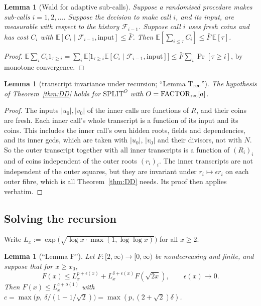 \documentclass[11pt]{amsart}
\newtheorem{lemma}[theorem]{Lemma}
\theoremstyle{definition}
\newcommand{\cF}{\mathcal{F}}
\newcommand{\Ex}{\mathbb{E}}
\newcommand{\Prob}{\Pr}
\begin{document}
\begin{lemma}[Wald for adaptive sub-calls]\label{lem:waldrec}
Suppose a randomised procedure makes sub-calls $i=1,2,\dots$. Suppose the decision to make call $i$, and its input, are measurable with
respect to the history $\cF_{i-1}$. Suppose call $i$ uses fresh coins and has cost $C_i$ with $\Ex[C_i\mid\cF_{i-1},\text{input}]\le\bar F$. Then
$\Ex[\sum_{i\le\tau}C_i]\le\bar F\,\Ex[\tau]$.
\end{lemma}

\begin{proof}
$\Ex\sum_iC_i1_{\tau\ge i}=\sum_i\Ex\bigl[1_{\tau\ge i}\Ex[C_i\mid\cF_{i-1},\text{input}]\bigr]\le\bar F\sum_i\Prob[\tau\ge i]$, by monotone
convergence.
\end{proof}

\begin{lemma}[transcript invariance under recursion; ``Lemma T$_{\rm rec}$'']\label{lem:Trec}
The hypothesis of Theorem~\ref{thm:DD} holds for $\mathrm{SPLIT}^O$ with $O=\mathrm{FACTOR}_{\rm rec}[a]$.
\end{lemma}

\begin{proof}
The inputs $|u_0|,|v_0|$ of the inner calls are functions of $R$, and their coins are fresh. Each inner call's whole transcript is a
function of its input and its coins. This includes the inner call's own hidden roots, fields and dependencies, and its inner gcds,
which are taken with $|u_0|$, $|v_0|$ and their divisors, not with $N$. So the outer transcript together with all inner transcripts is a
function of $(R_i)_i$ and of coins independent of the outer roots $(r_i)_i$. The inner transcripts are not independent of the outer squares,
but they are invariant under $r_i\mapsto\epsilon r_i$ on each outer fibre, which is all Theorem~\ref{thm:DD} needs. Its proof then applies verbatim.
\end{proof}

\subsection{Solving the recursion}

Write $L_x:=\exp\bigl(\sqrt{\log x\cdot\max(1,\log\log x)}\bigr)$ for all $x\ge2$.

\begin{lemma}[``Lemma F'']\label{lem:F}
Let $F:[2,\infty)\to[0,\infty)$ be nondecreasing and finite, and suppose that for $x\ge x_0$,
\[
F(x)\le L_x^{p+\epsilon(x)}+L_x^{\delta+\epsilon(x)}F(\sqrt{2x}),\qquad\epsilon(x)\to0 .
\]
Then $F(x)\le L_x^{c+o(1)}$ with $c=\max\bigl(p,\ \delta/(1-1/\sqrt2)\bigr)=\max(p,(2+\sqrt2)\delta)$.
\end{lemma}
\end{document}
